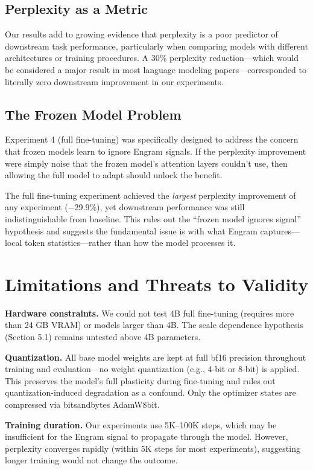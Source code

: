 \documentclass{article}
\begin{document}
\subsection{Perplexity as a Metric}

Our results add to growing evidence that perplexity is a poor predictor of downstream task performance, particularly when comparing models with different architectures or training procedures. A 30\% perplexity reduction---which would be considered a major result in most language modeling papers---corresponded to literally zero downstream improvement in our experiments.

\subsection{The Frozen Model Problem}

Experiment 4 (full fine-tuning) was specifically designed to address the concern that frozen models learn to ignore Engram signals. If the perplexity improvement were simply noise that the frozen model's attention layers couldn't use, then allowing the full model to adapt should unlock the benefit.

The full fine-tuning experiment achieved the \emph{largest} perplexity improvement of any experiment ($-$29.9\%), yet downstream performance was still indistinguishable from baseline. This rules out the ``frozen model ignores signal'' hypothesis and suggests the fundamental issue is with what Engram captures---local token statistics---rather than how the model processes it.

\section{Limitations and Threats to Validity}

\textbf{Hardware constraints.} We could not test 4B full fine-tuning (requires more than 24 GB VRAM) or models larger than 4B. The scale dependence hypothesis (Section 5.1) remains untested above 4B parameters.

\textbf{Quantization.} All base model weights are kept at full bf16 precision throughout training and evaluation---no weight quantization (e.g., 4-bit or 8-bit) is applied. This preserves the model's full plasticity during fine-tuning and rules out quantization-induced degradation as a confound. Only the optimizer states are compressed via bitsandbytes AdamW8bit.

\textbf{Training duration.} Our experiments use 5K--100K steps, which may be insufficient for the Engram signal to propagate through the model. However, perplexity converges rapidly (within 5K steps for most experiments), suggesting longer training would not change the outcome.
\end{document}
